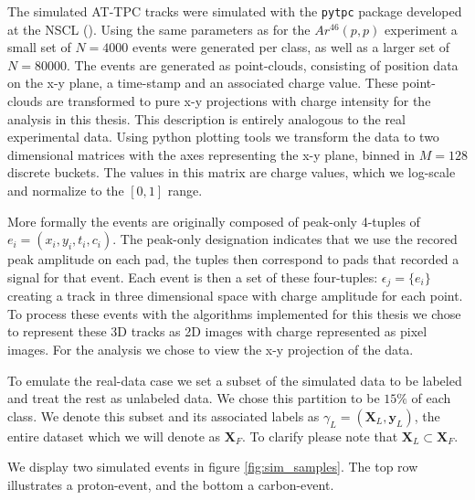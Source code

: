 The simulated AT-TPC tracks were simulated with the \lstinline{pytpc} package developed at the NSCL (\cite{Bradt2017a}). Using the same parameters as for the $Ar^{46}(p, p)$ experiment a small set of $N=4000$ events were generated per class, as well as a larger set of $N=80000$. The events are generated as point-clouds, consisting of position data on the x-y plane, a time-stamp and an associated charge value. These point-clouds are transformed to pure x-y projections with charge intensity for the analysis in this thesis. This description is entirely analogous to the real experimental data. Using python plotting tools we transform the data to two dimensional matrices with the axes representing the x-y plane, binned in $M=128$ discrete buckets. The values in this matrix are charge values, which we log-scale and normalize to the $[0, 1]$ range. 

More formally the events are originally composed of peak-only 4-tuples of $e_i = (x_i, y_i, t_i, c_i)$. The peak-only designation indicates that we use the recored peak amplitude on each pad, the tuples then correspond to pads that recorded a signal for that event. Each event is then a set of these four-tuples: $\epsilon_j = \{e_i\}$ creating a track in three dimensional space with charge amplitude for each point. To process these events with the algorithms implemented for this thesis we chose to represent these 3D tracks as 2D images with charge represented as pixel images. For the analysis we chose to view the x-y projection of the data.

To emulate the real-data case we set a subset of the simulated data to be labeled and treat the rest as unlabeled data. We chose this partition to be $15\%$ of each class. We denote this subset and its associated labels as $\gamma_L=(\mathbf{X}_L, \mathbf{y}_L)$, the entire dataset which we will denote as $\mathbf{X}_F$. To clarify please note that $\mathbf{X}_L \subset \mathbf{X}_F$.

We display two simulated events in figure \ref{fig:sim_samples}. The top row illustrates a proton-event, and the bottom a carbon-event. 

